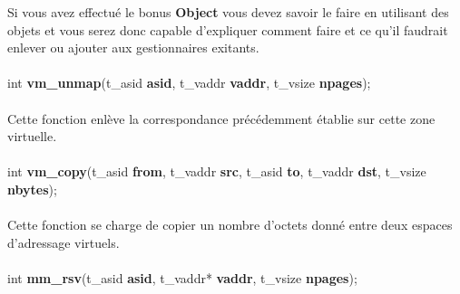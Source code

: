 \documentclass[10pt,a4wide]{article}
\begin{document}
Si vous avez effectu\'e le bonus \textbf{Object} vous devez savoir le faire
en utilisant des objets et vous serez donc capable d'expliquer comment
faire et ce qu'il faudrait enlever ou ajouter aux gestionnaires exitants.

\paragraph{}

\hspace{1.5cm}int \textbf{vm\_unmap}(t\_asid \textbf{asid},
                                     t\_vaddr \textbf{vaddr},
                                     t\_vsize \textbf{npages});

\paragraph{}

Cette fonction enl\`eve la correspondance pr\'ec\'edemment \'etablie
sur cette zone virtuelle.

\paragraph{}

\hspace{1.5cm}int \textbf{vm\_copy}(t\_asid \textbf{from},
                                    t\_vaddr \textbf{src},
                                    t\_asid \textbf{to},
                                    t\_vaddr \textbf{dst},
                                    t\_vsize \textbf{nbytes});

\paragraph{}

Cette fonction se charge de copier un nombre d'octets donn\'e entre
deux espaces d'adressage virtuels.

\paragraph{}

\hspace{1.5cm}int \textbf{mm\_rsv}(t\_asid \textbf{asid},
                                   t\_vaddr* \textbf{vaddr},
                                   t\_vsize \textbf{npages});

\paragraph{}
\end{document}

